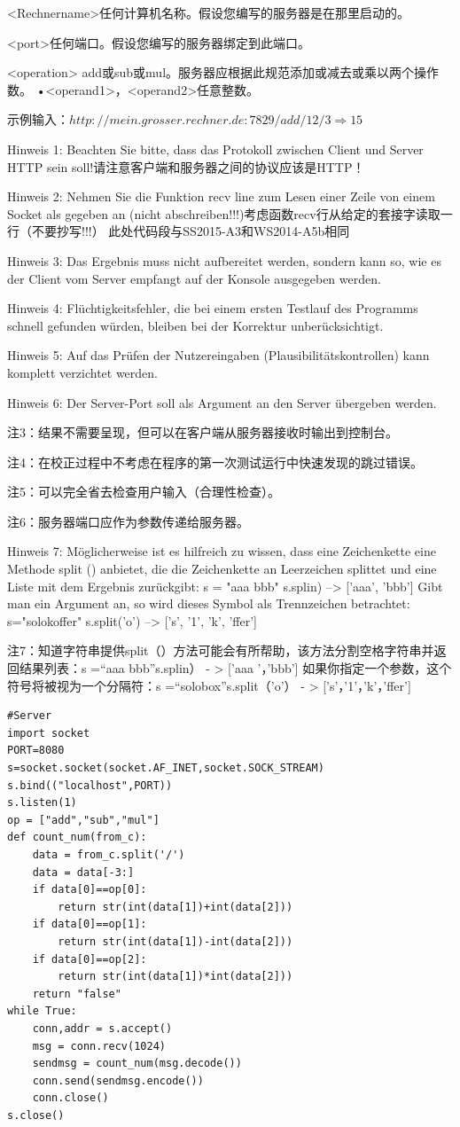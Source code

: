 \documentclass[fleqn]{article}
\begin{document}
<Rechnername>任何计算机名称。假设您编写的服务器是在那里启动的。

<port>任何端口。假设您编写的服务器绑定到此端口。

<operation> add或sub或mul。服务器应根据此规范添加或减去或乘以两个操作数。 •<operand1>，<operand2>任意整数。

示例输入：$http://mein.grosser .rechner. de: 7829/add/12/3 \Rightarrow 15$

Hinweis 1: Beachten Sie bitte, dass das Protokoll zwischen Client und Server HTTP sein soll!请注意客户端和服务器之间的协议应该是HTTP！

Hinweis 2: Nehmen Sie die Funktion recv line zum Lesen einer Zeile von einem Socket als gegeben an (nicht abschreiben!!!)考虑函数recv行从给定的套接字读取一行（不要抄写!!!）
此处代码段与SS2015-A3和WS2014-A5b相同

Hinweis 3: Das Ergebnis muss nicht aufbereitet werden, sondern kann so, wie es der Client vom Server empfangt auf der Konsole ausgegeben werden.

Hinweis 4: Flüchtigkeitsfehler, die bei einem ersten Testlauf des Programms schnell gefunden würden, bleiben bei der Korrektur unberücksichtigt.

Hinweis 5: Auf das Prüfen der Nutzereingaben (Plausibilitätskontrollen) kann komplett verzichtet werden.

Hinweis 6: Der Server-Port soll als Argument an den Server übergeben werden.

注3：结果不需要呈现，但可以在客户端从服务器接收时输出到控制台。

注4：在校正过程中不考虑在程序的第一次测试运行中快速发现的跳过错误。

注5：可以完全省去检查用户输入（合理性检查）。

注6：服务器端口应作为参数传递给服务器。

Hinweis 7: Möglicherweise ist es hilfreich zu wissen, dass eine Zeichenkette eine Methode split () anbietet, die die Zeichenkette an Leerzeichen splittet und eine Liste mit dem Ergebnis zurückgibt: s = "aaa bbb" s.splin) --> ['aaa', 'bbb']
Gibt man ein Argument an, so wird dieses Symbol als Trennzeichen betrachtet: s="solokoffer" s.split('o') --> ['s', '1', 'k', 'ffer']

注7：知道字符串提供split（）方法可能会有所帮助，该方法分割空格字符串并返回结果列表：s =“aaa bbb”s.splin） - > ['aaa '，'bbb']
如果你指定一个参数，这个符号将被视为一个分隔符：s =“solobox”s.split（'o'） - > ['s'，'1'，'k'，'ffer']

\begin{lstlisting}
#Server
import socket
PORT=8080
s=socket.socket(socket.AF_INET,socket.SOCK_STREAM)
s.bind(("localhost",PORT))
s.listen(1)
op = ["add","sub","mul"]
def count_num(from_c):
    data = from_c.split('/')
    data = data[-3:]
    if data[0]==op[0]:
        return str(int(data[1])+int(data[2]))
    if data[0]==op[1]:
        return str(int(data[1])-int(data[2]))
    if data[0]==op[2]:
        return str(int(data[1])*int(data[2]))
    return "false"
while True:
    conn,addr = s.accept()
    msg = conn.recv(1024)
    sendmsg = count_num(msg.decode())
    conn.send(sendmsg.encode())
    conn.close()
s.close()
\end{lstlisting}
\end{document}
